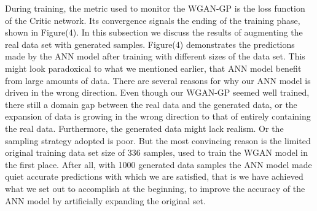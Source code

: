 \documentclass[draft, 10pt]{IEEEtran}
\begin{document}
During training, the metric used to monitor the WGAN-GP is the loss function of the Critic network. Its convergence signals the ending of the training phase, shown in Figure(4).
In this subsection we discuss the results of augmenting the real data set with generated samples. Figure(4) demonstrates the predictions made by the ANN model after training with different sizes of the data set.
This might look paradoxical to what we mentioned earlier, that ANN model benefit from large amounts of data. There are several reasons for why our ANN model is driven in the wrong direction. Even though our WGAN-GP seemed well trained, there still a domain gap between the real data and the generated data, or the expansion of data is growing in the wrong direction to that of entirely containing the real data. Furthermore, the generated data might lack realism. Or the sampling strategy adopted is poor. But the most convincing reason is the limited original training data set size of 336 samples, used to train the WGAN model in the first place. After all, with 1000 generated data samples the ANN model made quiet accurate predictions with which we are satisfied, that is we have achieved what we set out to accomplish at the beginning, to improve the accuracy of the ANN model by artificially expanding the original set.
\end{document}
